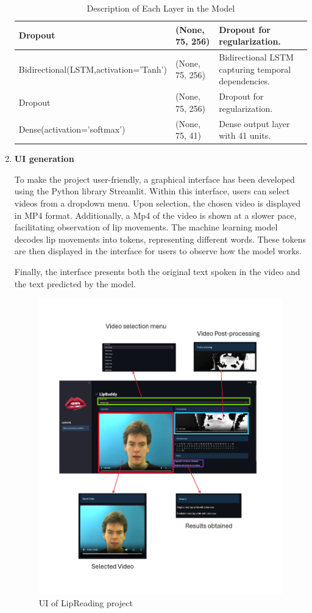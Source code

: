 \begin{enumerate}
\begin{table}[H]
\begin{tabularx}{\textwidth}{|l|X|X|}
    \hline
    Dropout & (None, 75, 256) & Dropout for regularization. \\
    \hline
    Bidirectional(LSTM,activation='Tanh') & (None, 75, 256) & Bidirectional LSTM capturing temporal dependencies. \\
    \hline
    Dropout & (None, 75, 256) & Dropout for regularization. \\
    \hline
    Dense(activation='softmax') & (None, 75, 41) & Dense output layer with 41 units. \\
    \hline
\end{tabularx}
\caption{Description of Each Layer in the Model}
\end{table}
\newpage
\item \textbf{\large UI generation}

    To make the project user-friendly, a graphical interface has been developed using the Python library Streamlit. Within this interface, users can select videos from a dropdown menu. Upon selection, the chosen video is displayed in MP4 format. Additionally, a Mp4 of the video is shown at a slower pace, facilitating observation of lip movements.
    The machine learning model decodes lip movements into tokens, representing different words. These tokens are then displayed in the interface for users to observe how the model works.
    
    Finally, the interface presents both the original text spoken in the video and the text predicted by the model. 
    \begin{figure}[H]
        \centering
        \includegraphics[width=1\linewidth]{img/null.png}
        \caption{UI of LipReading project}
        
    \end{figure}
\end{enumerate} 
    